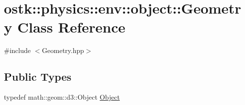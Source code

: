 \hypertarget{classostk_1_1physics_1_1env_1_1object_1_1_geometry}{}\section{ostk\+:\+:physics\+:\+:env\+:\+:object\+:\+:Geometry Class Reference}
\label{classostk_1_1physics_1_1env_1_1object_1_1_geometry}


{\ttfamily \#include $<$Geometry.\+hpp$>$}

\subsection*{Public Types}
\begin{DoxyCompactItemize}
\item 
typedef math\+::geom\+::d3\+::\+Object \hyperlink{classostk_1_1physics_1_1env_1_1object_1_1_geometry_abeade8931056612deaa868abdaac8c9c}{Object}
\end{DoxyCompactItemize}
